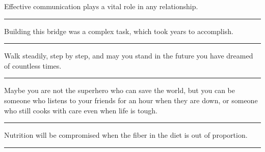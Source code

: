 \documentclass[11pt,a4paper]{article}
\newcommand{\num}[1]{\makebox[1.9em][r]{#1.}\hspace{0.3em}}
\newcommand{\wline}{\noindent\rule{\linewidth}{0.4pt}}
\begin{document}
\vspace{0.35em}\vspace{0.15em}

\begin{minipage}{\linewidth}

\num{9}Effective communication plays a vital role in any relationship.

\vspace{0.25em}

\wline

\end{minipage}

\begin{minipage}{\linewidth}

\num{10}Building this bridge was a complex task, which took years to accomplish.

\vspace{0.25em}

\wline

\end{minipage}

\begin{minipage}{\linewidth}

\num{11}Walk steadily, step by step, and may you stand in the future you have dreamed of countless times.

\vspace{0.25em}

\wline

\end{minipage}

\begin{minipage}{\linewidth}

\num{12}Maybe you are not the superhero who can save the world, but you can be someone who listens to your friends for an hour when they are down, or someone who still cooks with care even when life is tough.

\vspace{0.25em}

\wline

\end{minipage}

\vspace{0.35em}\vspace{0.15em}

\begin{minipage}{\linewidth}

\num{13}Nutrition will be compromised when the fiber in the diet is out of proportion.

\vspace{0.25em}

\wline

\end{minipage}
\end{document}

